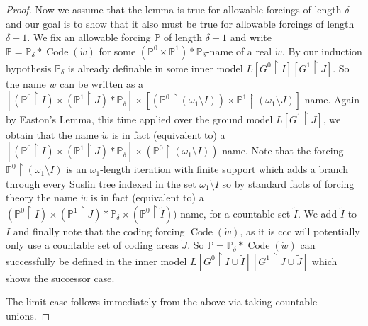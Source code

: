 \documentclass[a4paper,11pt]{article}
\newcommand{\forceP}{\mathbb{P}}
\begin{document}
\begin{proof}
    Now we assume that the lemma is true for allowable forcings of length $\delta$ and our goal is to show that it also must be true for allowable forcings of length $\delta+1$.
    We fix an allowable forcing $\forceP$ of length $\delta+1$ and write $\forceP= \forceP_{\delta} \ast \operatorname{Code} (\dot{w})$ for some $(\forceP^0 \times \forceP^1)\ast \forceP_{\delta}$-name of a real $\dot{w}$. By our induction hypothesis $\forceP_{\delta}$ is already definable in some inner model $L[G^0 \upharpoonright I] [G^1 \upharpoonright J]$. So the name $\dot{w}$ can be written as a $[(\forceP^0 \upharpoonright I) \times (\forceP^1 \upharpoonright J) \ast \forceP_{\delta}] \times [(\forceP^0 \upharpoonright (\omega_1 \setminus I)) \times \forceP^1 \upharpoonright (\omega_1 \setminus J)]$-name. Again by Easton's Lemma, this time applied over the ground model $L[G^1 \upharpoonright J]$, we obtain that the name $\dot{w}$ is in fact (equivalent to) a   $[(\forceP^0 \upharpoonright I) \times (\forceP^1 \upharpoonright J) \ast \forceP_{\delta}] \times (\forceP^0 \upharpoonright (\omega_1 \setminus I))$-name. Note that the forcing $\forceP^0 \upharpoonright (\omega_1 \setminus I)$ is an $\omega_1$-length iteration with finite support which adds a branch through every Suslin tree indexed in the set $\omega_1 \setminus I$ so by standard facts of forcing theory the name $\dot{w}$ is in fact (equivalent to) a $(\forceP^0 \upharpoonright I) \times (\forceP^1 \upharpoonright J) \ast \forceP_{\delta} \times (\forceP^0 \upharpoonright \tilde{I}))$-name, for a countable set $\tilde{I}$. We add $\tilde{I}$ to $I$ and finally note that the coding forcing $\operatorname{Code}(\dot{w})$, as it is ccc will potentially only use a countable set of coding areas $\tilde{J}$. So $\forceP= \forceP_{\delta} \ast \operatorname{Code} (\dot{w})$ can successfully be defined in the inner model
    $L[G^0 \upharpoonright I \cup \tilde{I}][G^1 \upharpoonright J \cup \tilde{J}]$ which shows the successor case.

    The limit case follows immediately from the above via taking countable unions. 
    \end{proof}


\end{document}
